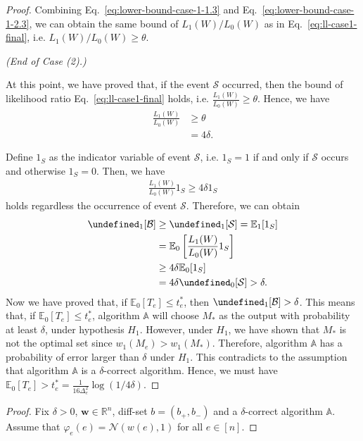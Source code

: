 \documentclass{article}
\newcommand{\Rew}{\varphi}
\newcommand{\E}{\mathbb E}
\newcommand{\RR}{\mathbb R}
\let\Pr\undefined
\DeclareMathOperator{\Pr}{Pr}
\renewcommand{\vec}[1]{\boldsymbol{#1}}
\begin{document}
\begin{spacing}{1.1}
\begin{proof}
Combining Eq.~\eqref{eq:lower-bound-case-1-1.3} and Eq.~\eqref{eq:lower-bound-case-1-2.3}, we  can obtain the same bound of $L_1(W)/L_0(W)$ as in Eq.~\eqref{eq:ll-case1-final}, i.e. $L_1(W)/L_0(W) \ge \theta$.

\emph{(End of Case (2).)}

At this point, we have proved that, if the event $\mathcal S$ occurred, then the bound of likelihood ratio Eq.~\eqref{eq:ll-case1-final} holds, i.e. $\frac{L_1(W)}{L_0(W)} \ge \theta$.
Hence, we have
\begin{align}
\frac{L_1(W)}{L_0(W)} &\ge \theta \nonumber \\
					  &= 4\delta.	
\end{align}


Define $1_S$ as the indicator variable of event $\mathcal S$, i.e. $1_S = 1$ if and only if $\mathcal S$ occurs and otherwise $1_S = 0$.
Then, we have
\begin{align*}
\frac{L_1(W)}{L_0(W)} 1_S \ge 4\delta 1_S
\end{align*}
holds regardless the occurrence of event $\mathcal S$.
Therefore, we can obtain
\begin{align*}
\Pr_1[\mathcal B] &\ge \Pr_1[\mathcal S] = \E_1[1_S] \\
				  &= \E_0\left[\frac{L_1(W)}{L_0(W)} 1_S\right] \\
				  &\ge 4\delta \E_0[1_S] \\
				  &= 4\delta \Pr_0[\mathcal S] > \delta.
\end{align*}
Now we have proved that, if $\E_0[T_e] \le t_e^*$, then $\Pr_1[\mathcal B]>\delta$.
This means that, if $\E_0[T_e] \le t_e^*$, algorithm $\mathbb A$ will choose $M_*$ as the output with probability at least $\delta$, under hypothesis $H_1$.
However, under $H_1$, we have shown that $M_*$ is not the optimal set since $w_1(M_e) > w_1(M_*)$.
Therefore, algorithm $\mathbb A$ has a probability of error larger than $\delta$ under $H_1$. 
This contradicts to the assumption that algorithm $\mathbb A$ is a $\delta$-correct algorithm.
Hence, we must have $\E_0[T_e] > t_e^* = \frac{1}{16\Delta_e^2}\log(1/4\delta)$.

\end{proof}

\begin{proof}
Fix $\delta >0$, $\vec w\in \RR^{n}$, diff-set $b=(b_+,b_-)$ and a $\delta$-correct algorithm $\mathbb A$.
Assume that $\Rew_e(e)=\mathcal N(w(e),1)$ for all $e\in[n]$.




\end{proof}
\end{spacing}
\end{document}
